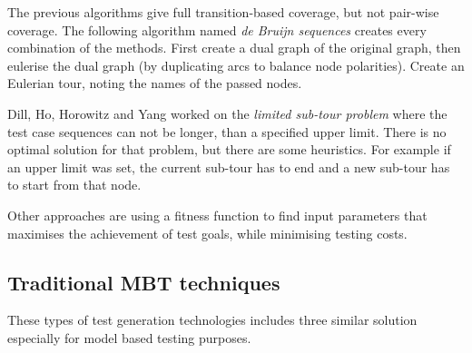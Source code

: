 The previous algorithms give full transition-based coverage, but not pair-wise coverage. The following algorithm named \textit{de Bruijn sequences} creates every combination of the methods. First create a dual graph of the original graph, then eulerise the dual graph (by duplicating arcs to balance node polarities). Create an Eulerian tour, noting the names of the passed nodes.

Dill, Ho, Horowitz and Yang worked on the \textit{limited sub-tour problem} where the test case sequences can not be longer, than a specified upper limit. There is no optimal solution for that problem, but there are some heuristics. For example if an upper limit was set, the current sub-tour has to end and a new sub-tour has to start from that node.

Other approaches are using a fitness function to find input parameters that maximises the achievement of test goals, while minimising testing costs.


\subsection{Traditional MBT techniques}
\label{sub:modelchecking}

These types of test generation technologies includes three similar solution especially for model based testing purposes.

